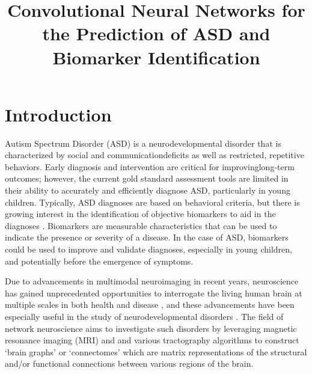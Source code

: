 \documentclass[10pt,conference]{IEEEtran}
\begin{document}
\title{Convolutional Neural Networks for the Prediction of ASD and 
       Biomarker Identification}

\author{
}

\maketitle




\section{Introduction}

Autism Spectrum Disorder (ASD) is a neurodevelopmental disorder that is characterized by 
social and communicationdeficits as well as restricted, repetitive behaviors. Early 
diagnosis and intervention are critical for improvinglong-term outcomes; however, the 
current gold standard assessment tools are limited in their ability to accurately and 
efficiently diagnose ASD, particularly in young children. Typically, ASD diagnoses are 
based on behavioral criteria, but there is growing interest in the identification of 
objective biomarkers to aid in the diagnoses \cite{Shen.2019}. Biomarkers are measurable 
characteristics that can be used to indicate the presence or severity of a disease. In the 
case of ASD, biomarkers could be used to improve and validate diagnoses, especially in 
young children, and potentially before the emergence of symptoms.

Due to advancements in multimodal neuroimaging in recent years, neuroscience has gained 
unprecedented opportunities to interrogate the living human brain at multiple scales in 
both health and disease \cite{Hong.2019}, and these advancements have been especially 
useful in the study of neurodevelopmental disorders \cite{Nunes.2019}. The field of 
network neuroscience aims to investigate such disorders by leveraging magnetic resonance 
imaging (MRI) and and various tractography algorithms to construct `brain graphs' or 
`connectomes' which are matrix representations of the structural and/or functional 
connections between various regions of the brain. 
\end{document}
